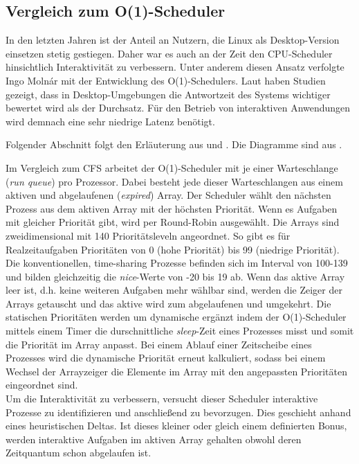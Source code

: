\subsection{Vergleich zum O(1)-Scheduler}\label{s:compO1}
In den letzten Jahren ist der Anteil an Nutzern, die Linux als Desktop-Version einsetzen stetig gestiegen. Daher war es auch an der Zeit den CPU-Scheduler hinsichtlich Interaktivität zu verbessern. Unter anderem diesen Ansatz verfolgte Ingo Molnár mit der Entwicklung des O(1)-Sche\-dulers. Laut \cite{papercomparison} haben Studien gezeigt, dass in Desktop-Umgebungen die Antwortzeit des Systems wichtiger bewertet wird als der Durchsatz. Für den Betrieb von interaktiven Anwendungen wird demnach eine sehr niedrige Latenz benötigt. 

Folgender Abschnitt folgt den Erläuterung aus \cite{asilberschatz} und \cite{papercomparison}. Die Diagramme sind aus \cite{papercomparison}.

Im Vergleich zum CFS arbeitet der O(1)-Scheduler mit je einer Warteschlange (\textit{run queue}) pro Prozessor. Dabei besteht jede dieser Warteschlangen aus einem aktiven und abgelaufenen (\textit{expired}) Array. Der Scheduler wählt den nächsten Prozess aus dem aktiven Array mit der höchsten Priorität. Wenn es Aufgaben mit gleicher Priorität gibt, wird per Round-Robin ausgewählt. Die Arrays sind zweidimensional mit 140 Prioritätsleveln angeordnet. So gibt es für Realzeitaufgaben Prioritäten von 0 (hohe Priorität) bis 99 (niedrige Priorität). Die konventionellen, time-shar\-ing Prozesse befinden sich im Interval von 100-139 und bilden gleichzeitig die \textit{nice}-Werte von -20 bis 19 ab. Wenn das aktive Array leer ist, d.h. keine weiteren Aufgaben mehr wählbar sind, werden die Zeiger der Arrays getauscht und das aktive wird zum abgelaufenen und umgekehrt. Die statischen Prioritäten werden um dynamische ergänzt indem der O(1)-Scheduler mittels einem Timer die durschnittliche \textit{sleep}-Zeit eines Prozesses misst und somit die Priorität im Array anpasst. Bei einem Ablauf einer Zeitscheibe eines Prozesses wird die dynamische Priorität erneut kalkuliert, sodass bei einem Wechsel der Arrayzeiger die Elemente im Array mit den angepassten Prioritäten eingeordnet sind. \\
Um die Interaktivität zu verbessern, versucht dieser Scheduler  interaktive Prozesse zu identifizieren und anschließend zu bevorzugen. Dies geschieht anhand eines heu\-ris\-tisch\-en Deltas. Ist dieses kleiner oder gleich einem definierten Bonus, werden interaktive Aufgaben im aktiven Array gehalten obwohl deren Zeitquantum schon abgelaufen ist.

